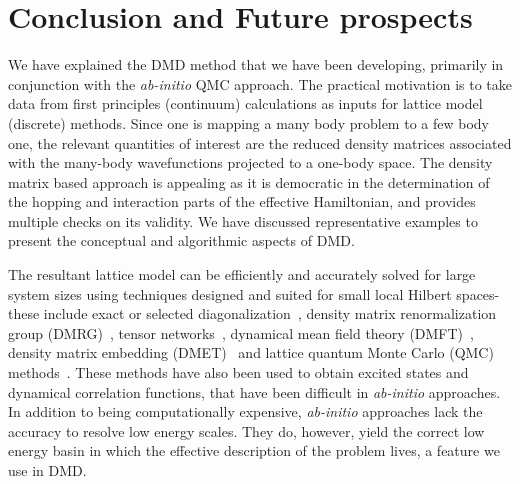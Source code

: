 \section{Conclusion and Future prospects}
We have explained the DMD method that we have been developing, primarily in conjunction with the 
\emph{ab-initio} QMC approach. The practical motivation is to take data from first principles (continuum) 
calculations as inputs for lattice model (discrete) methods. 
Since one is mapping a many body problem to a few body one, the relevant quantities of interest are 
the reduced density matrices associated with the many-body wavefunctions projected to a one-body space. 
The density matrix based approach is appealing as it is democratic 
in the determination of the hopping and interaction parts of the effective Hamiltonian, and provides multiple 
checks on its validity. We have discussed representative examples to present the conceptual and algorithmic aspects of DMD. 

The resultant lattice model can be efficiently and accurately solved for large system sizes 
using techniques designed and suited for small local Hilbert spaces- these include exact or 
selected diagonalization~\cite{DeRaedt,Tubman_selci,Holmes_Tubman_Umrigar}, 
density matrix renormalization group (DMRG)~\cite{White1992}, tensor networks~\cite{PEPS,Changlani_CPS,NeuscammanCPS}, 
dynamical mean field theory (DMFT)~\cite{Kotliar2006}, density matrix embedding (DMET)~\cite{DMET_2012} and 
lattice quantum Monte Carlo (QMC) methods~\cite{Scalapino, Trivedi_Ceperley, Zhang_AFQMC, Sandvik_loops, Prokofiev, 
Booth2009,SQMC,Holmes_Changlani_Umrigar, Booth2013}. These methods have also been used to obtain excited states 
and dynamical correlation functions, that have been difficult in \textit{ab-initio} approaches. In addition to being computationally expensive, \textit{ab-initio} approaches lack the accuracy to resolve low energy scales. They do, however, yield the 
correct low energy basin in which the effective description of the problem lives, a feature we use in DMD. 

